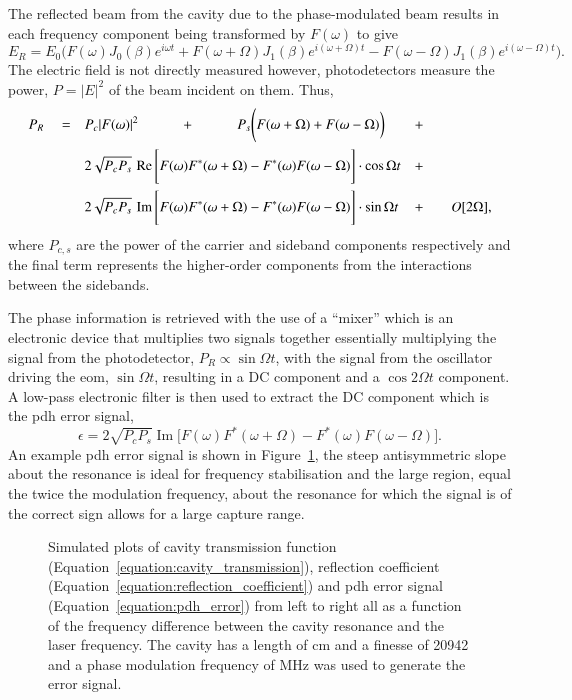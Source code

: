 {The reflected beam from the cavity due to the phase-modulated beam results in each frequency component being transformed by $F(\omega)$ to give
\begin{equation}
E_R = E_0 \Bigg(F(\omega)J_0(\beta)e^{i\omega t} + F(\omega+\Omega)J_1(\beta)e^{i(\omega+\Omega) t} - F(\omega-\Omega)J_1(\beta)e^{i(\omega-\Omega) t} \Bigg).
\end{equation}
The electric field is not directly measured however, photodetectors measure the power, $P=|E|^2$ of the beam incident on them.
Thus,
\begin{align}
P_R \quad= \quad&P_c|F(\omega)|^2 \quad\qquad+\quad\qquad P_s \Bigg( F(\omega+\Omega) + F(\omega-\Omega)\bigg) &+\qquad&\notag\\
& 2\sqrt{P_cP_s} \, \operatorname{Re}\Bigg[ F(\omega)F^*(\omega+\Omega)-F^*(\omega)F(\omega-\Omega)\Bigg]\cdot\cos\Omega t &+\qquad& \notag\\
& 2\sqrt{P_cP_s} \, \operatorname{Im}\Bigg[ F(\omega)F^*(\omega+\Omega)-F^*(\omega)F(\omega-\Omega)\Bigg]\cdot\sin\Omega t &+ \qquad&O[2\Omega],
\end{align}
where $P_{c,s}$ are the power of the carrier and sideband components respectively and the final term represents the higher-order components from the interactions between the sidebands.

The phase information is retrieved with the use of a ``mixer'' which is an electronic device that multiplies two signals together essentially multiplying the signal from the photodetector, $P_R \propto \sin\Omega t$, with the signal from the oscillator driving the \gls{eom}, $\sin\Omega t$, resulting in a DC component and a $\cos2\Omega t$ component.
A low-pass electronic filter is then used to extract the DC component which is the \gls{pdh} error signal,
\begin{equation}\label{equation:pdh_error}
\epsilon = 2\sqrt{P_cP_s}\operatorname{Im}\Bigg[F(\omega)F^*(\omega+\Omega) - F^*(\omega)F(\omega-\Omega)\Bigg].
\end{equation}
An example \gls{pdh} error signal is shown in Figure~\ref{figure:pdh_plots}, the steep antisymmetric slope about the resonance is ideal for frequency stabilisation and the large region, equal the twice the modulation frequency, about the resonance for which the signal is of the correct sign allows for a large capture range. 

\begin{figure}
\centering

\caption{Simulated plots of cavity transmission function (Equation~\ref{equation:cavity_transmission}), reflection coefficient (Equation~\ref{equation:reflection_coefficient}) and \gls{pdh} error signal (Equation~\ref{equation:pdh_error}) from left to right all as a function of the frequency difference between the cavity resonance and the laser frequency.
The cavity has a length of \unit[10]{cm} and a finesse of 20942 and a phase modulation frequency of \unit[2]{MHz} was used to generate the error signal.}
\label{figure:pdh_plots}
\end{figure}

}
